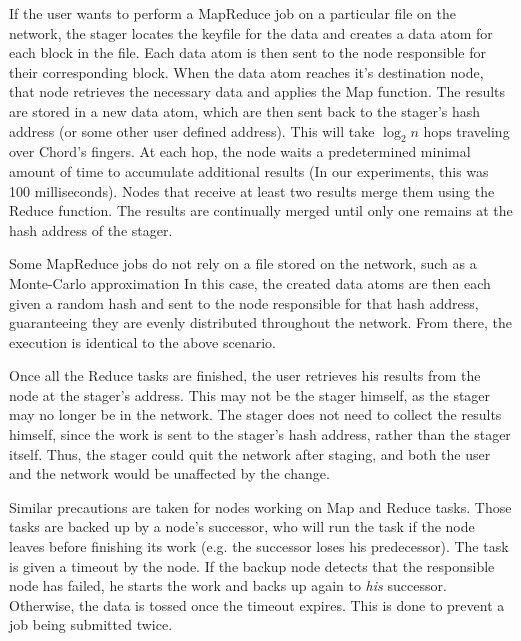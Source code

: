 If the user wants to perform a MapReduce job on a particular file on the network, the stager locates the keyfile for the data and creates a data atom for each block in the file.  
Each data atom is then sent to the node responsible for their corresponding block.  
When the data atom reaches it's destination node, that node retrieves the necessary data and applies the Map function.  
The results are stored in a new data atom,  which are then sent back to the stager's hash address (or some other user defined address).  
This will take $\log_{2} n$ hops traveling over Chord's fingers.  
At each hop, the node waits a predetermined minimal amount of time to accumulate additional results (In our experiments, this was 100 milliseconds).  
Nodes that receive at least two results merge them using the Reduce function.  
The results are continually merged until only one remains at the hash address of the stager. 


Some MapReduce jobs do not rely on a file stored on the network, such as a Monte-Carlo approximation
In this case, the created data atoms are then each given a random hash and sent to the node responsible for that hash address, guaranteeing they are evenly distributed throughout the network. 
From there, the execution is identical to the above scenario.



Once all the Reduce tasks are finished, the user retrieves his results from the node at the stager's address.  
This may not be the stager himself, as the stager may no longer be in the network.  
The stager does not need to collect the results himself, since the work is sent to the stager's hash address, rather than the stager itself.  
Thus, the stager could quit the network after staging, and both the user and the network would be unaffected by the change. %

Similar precautions are taken for nodes working on Map and Reduce tasks.  
Those tasks are backed up by a node's successor, who will run the task if the node leaves before finishing its work (e.g. the successor loses his predecessor).   
The task is given a timeout by the node.  
If the backup node detects that the responsible node has failed, he starts the work and backs up again to \emph{his} successor.  
Otherwise, the data is tossed once the timeout expires.
This is done to prevent a job being submitted twice.

